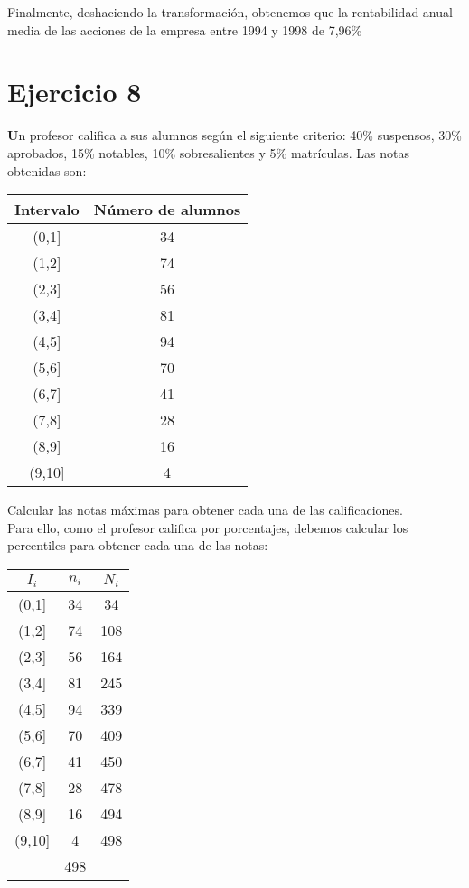 \documentclass[a4paper,12pt]{article}
\begin{document}
Finalmente, deshaciendo la transformación, obtenemos que la rentabilidad anual media de las acciones de la empresa entre 1994 y 1998 de 7,96\%

\section*{Ejercicio 8}
\textbf Un profesor califica a sus alumnos según el siguiente criterio: 40\% suspensos, 30\% aprobados, 15\% notables, 10\% sobresalientes y 5\% matrículas. Las notas obtenidas son:

\begin{center}
    \begin{tabular}{c|c}
        Intervalo & Número de alumnos \\
        \hline
        (0,1] & 34 \\
        (1,2] & 74 \\
        (2,3] & 56 \\
        (3,4] & 81 \\
        (4,5] & 94 \\
        (5,6] & 70 \\
        (6,7] & 41 \\
        (7,8] & 28 \\
        (8,9] & 16 \\
        (9,10] & 4 \\
    \end{tabular}
\end{center}

Calcular las notas máximas para obtener cada una de las calificaciones.\\

Para ello, como el profesor califica por porcentajes, debemos calcular los percentiles para obtener cada una de las notas:\\

\begin{center}
    \begin{tabular}{|c|c|c|}
    \hline
        $I_i$ & $n_i$ & $N_i$\\
        \hline
        (0,1] & 34 & 34\\
        (1,2] & 74 & 108\\
        (2,3] & 56 & 164\\
        (3,4] & 81 & 245\\
        (4,5] & 94 & 339\\
        (5,6] & 70 & 409\\
        (6,7] & 41 & 450\\
        (7,8] & 28 & 478\\
        (8,9] & 16 & 494\\
        (9,10] & 4 & 498\\
        \hline
        & 498 & \\
        \hline
    \end{tabular}
\end{center}
\end{document}
